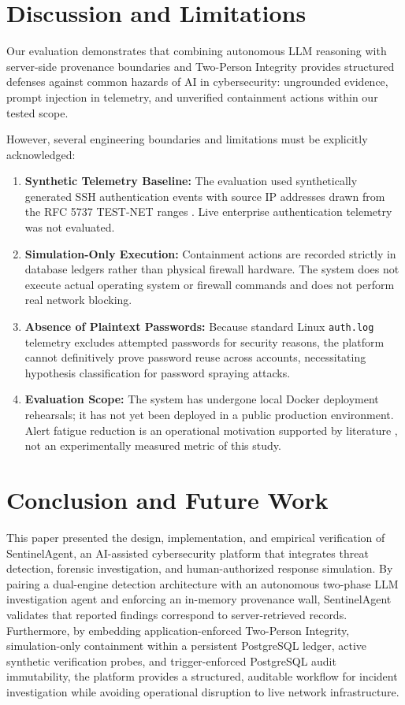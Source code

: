 \documentclass[conference]{IEEEtran}
\begin{document}
\section{Discussion and Limitations}
Our evaluation demonstrates that combining autonomous LLM reasoning with server-side provenance boundaries and Two-Person Integrity provides structured defenses against common hazards of AI in cybersecurity: ungrounded evidence, prompt injection in telemetry, and unverified containment actions within our tested scope.

However, several engineering boundaries and limitations must be explicitly acknowledged:
\begin{enumerate}
    \item \textbf{Synthetic Telemetry Baseline:} The evaluation used synthetically generated SSH authentication events with source IP addresses drawn from the RFC 5737 TEST-NET ranges \cite{arkko2010ipv4}. Live enterprise authentication telemetry was not evaluated.
    \item \textbf{Simulation-Only Execution:} Containment actions are recorded strictly in database ledgers rather than physical firewall hardware. The system does not execute actual operating system or firewall commands and does not perform real network blocking.
    \item \textbf{Absence of Plaintext Passwords:} Because standard Linux \texttt{auth.log} telemetry excludes attempted passwords for security reasons, the platform cannot definitively prove password reuse across accounts, necessitating hypothesis classification for password spraying attacks.
    \item \textbf{Evaluation Scope:} The system has undergone local Docker deployment rehearsals; it has not yet been deployed in a public production environment. Alert fatigue reduction is an operational motivation supported by literature \cite{chhetri2024towards}, not an experimentally measured metric of this study.
\end{enumerate}

\section{Conclusion and Future Work}
This paper presented the design, implementation, and empirical verification of SentinelAgent, an AI-assisted cybersecurity platform that integrates threat detection, forensic investigation, and human-authorized response simulation. By pairing a dual-engine detection architecture with an autonomous two-phase LLM investigation agent and enforcing an in-memory provenance wall, SentinelAgent validates that reported findings correspond to server-retrieved records. Furthermore, by embedding application-enforced Two-Person Integrity, simulation-only containment within a persistent PostgreSQL ledger, active synthetic verification probes, and trigger-enforced PostgreSQL audit immutability, the platform provides a structured, auditable workflow for incident investigation while avoiding operational disruption to live network infrastructure.
\end{document}
